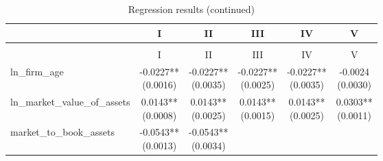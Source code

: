 \documentclass{article}
\begin{document}
\begin{longtable}{@{\extracolsep{\fill}}lccccc}
    \caption{Regression results}                                                  \\
    \toprule
                                  & I      & II     & III    & IV        & V      \\
    \midrule
    \endfirsthead
    \caption[]{Regression results (continued)}                                    \\
    \toprule
                                  & I      & II     & III    & IV        & V      \\
    \midrule
    \endhead
    \midrule
    \endfoot
    \bottomrule
    \endlastfoot
    ln\_firm\_age                 &
    \makecell{-0.0227**                                                           \\(0.0016)} &
    \makecell{-0.0227**                                                           \\(0.0035)} &
    \makecell{-0.0227**                                                           \\(0.0025)} &
    \makecell{-0.0227**                                                           \\(0.0035)} &
    \makecell{-0.0024                                                             \\(0.0030)} \\
    ln\_market\_value\_of\_assets &
    \makecell{0.0143**                                                            \\(0.0008)} &
    \makecell{0.0143**                                                            \\(0.0025)} &
    \makecell{0.0143**                                                            \\(0.0015)} &
    \makecell{0.0143**                                                            \\(0.0025)} &
    \makecell{0.0303**                                                            \\(0.0011)} \\
    market\_to\_book\_assets      &
    \makecell{-0.0543**                                                           \\(0.0013)} &
    \makecell{-0.0543**                                                           \\(0.0034)} &

\end{longtable}
\end{document}
